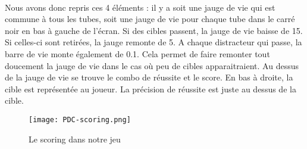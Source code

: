\paragraph{}Nous avons donc repris ces 4 éléments : il y a soit une jauge de vie qui est commune à tous les tubes, soit une jauge de vie pour chaque tube dans le carré noir en bas à
gauche de l'écran. Si des cibles passent, la jauge de vie baisse de 15. Si celles-ci sont retirées, la jauge remonte de 5. A chaque distracteur qui passe, la barre de vie monte
également de 0.1. Cela permet de faire remonter tout doucement la jauge de vie dans le cas où peu de cibles apparaitraient. Au dessus de la jauge de vie se trouve le combo de réussite
et le score. En bas à droite, la cible est représentée au joueur. La précision de réussite est juste au dessus de la cible.

\begin{figure}[H]
    \begin{center}
    \texttt{[image: PDC-scoring.png]}
    \end{center}
    \caption{Le scoring dans notre jeu}
\label{ScoringPDCInspiration}
\end{figure}

\label{prototypage}
